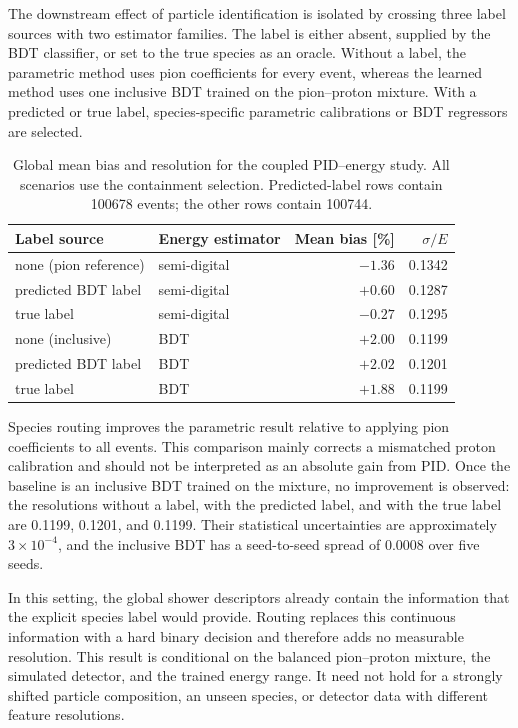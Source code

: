 \documentclass[11pt,a4paper]{article}
\begin{document}
The downstream effect of particle identification is isolated by crossing three label
sources with two estimator families. The label is either absent, supplied by the BDT
classifier, or set to the true species as an oracle. Without a label, the parametric
method uses pion coefficients for every event, whereas the learned method uses one
inclusive BDT trained on the pion--proton mixture. With a predicted or true label,
species-specific parametric calibrations or BDT regressors are selected.

\begin{table}[tb]
  \centering
  \caption{Global mean bias and resolution for the coupled PID--energy study. All
  scenarios use the containment selection. Predicted-label rows contain 100678 events;
  the other rows contain 100744.}
  \label{tab:coupling}
  \begin{tabular}{llrr}
    \toprule
    Label source & Energy estimator & Mean bias [\%] & $\sigma/E$ \\
    \midrule
    none (pion reference) & semi-digital & $-1.36$ & 0.1342 \\
    predicted BDT label & semi-digital & $+0.60$ & 0.1287 \\
    true label & semi-digital & $-0.27$ & 0.1295 \\
    \midrule
    none (inclusive) & BDT & $+2.00$ & 0.1199 \\
    predicted BDT label & BDT & $+2.02$ & 0.1201 \\
    true label & BDT & $+1.88$ & 0.1199 \\
    \bottomrule
  \end{tabular}
\end{table}

Species routing improves the parametric result relative to applying pion coefficients
to all events. This comparison mainly corrects a mismatched proton calibration and
should not be interpreted as an absolute gain from PID. Once the baseline is an
inclusive BDT trained on the mixture, no improvement is observed: the resolutions
without a label, with the predicted label, and with the true label are 0.1199, 0.1201,
and 0.1199. Their statistical uncertainties are approximately $3\times10^{-4}$, and
the inclusive BDT has a seed-to-seed spread of 0.0008 over five seeds.

In this setting, the global shower descriptors already contain the information that
the explicit species label would provide. Routing replaces this continuous information
with a hard binary decision and therefore adds no measurable resolution. This result
is conditional on the balanced pion--proton mixture, the simulated detector, and the
trained energy range. It need not hold for a strongly shifted particle composition,
an unseen species, or detector data with different feature resolutions.
\end{document}
